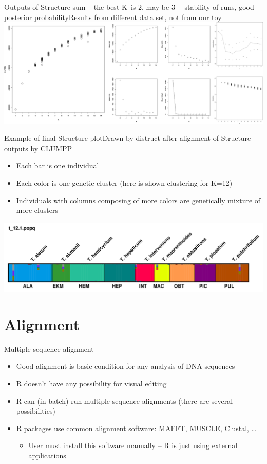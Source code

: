 \documentclass[compress, ucs, xelatex, 11pt, xcolor=svgnames,
  hyperref={
    bookmarks=true,
    unicode=true,
    colorlinks=true,
    pdftitle={Molecular data in R},
    plainpages=false,
    pdfauthor={Vojtech Zeisek},
    pdfsubject={Course about phylogeny and evolution in R},
    pdfcreator={XeLaTeX},
    pdfkeywords={R, evolution, phylogeny, molecular data},
    linkcolor=Tomato,
    anchorcolor=SaddleBrown,
    citecolor=Goldenrod,
    filecolor=DarkMagenta,
    menucolor=Sienna,
    urlcolor=DarkTurquoise,
    pdftex},
  url={hyphens, lowtilde} %
  ]{beamer}
\begin{document}
\begin{frame}{Outputs of Structure-sum -- the best K~is 2, may be 3~-- stability of runs, good posterior probability}{Results from different data set, not from our toy}
  \includegraphics[width=\textwidth]{structure.png}
\end{frame}

\begin{frame}{Example of final Structure plot}{Drawn by distruct after alignment of Structure outputs by CLUMPP}
  \begin{itemize}
    \item Each bar is one individual
    \item Each color is one genetic cluster (here is shown clustering for K=12)
    \item Individuals with columns composing of more colors are genetically mixture of more clusters
  \end{itemize}
  \includegraphics[width=\textwidth]{structure-fin.png}
\end{frame}

\section{Alignment}

\begin{frame}{Multiple sequence alignment}
  \begin{itemize}
    \item Good alignment is basic condition for any analysis of DNA sequences
    \item R doesn't have any possibility for visual editing
    \item R can (in batch) run multiple sequence alignments (there are several possibilities)
    \item R packages use common alignment software: \href{http://mafft.cbrc.jp/alignment/software/}{MAFFT}, \href{http://www.drive5.com/muscle/}{MUSCLE}, \href{http://www.clustal.org/}{Clustal}, \ldots
    \begin{itemize}
      \item User must install this software manually -- R is just using external applications
    \end{itemize}
  \end{itemize}
\end{frame}
\end{document}
